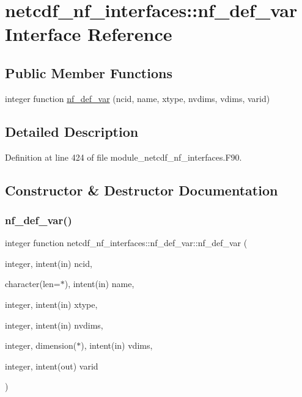 \hypertarget{interfacenetcdf__nf__interfaces_1_1nf__def__var}{}\section{netcdf\+\_\+nf\+\_\+interfaces\+:\+:nf\+\_\+def\+\_\+var Interface Reference}
\label{interfacenetcdf__nf__interfaces_1_1nf__def__var}
\subsection*{Public Member Functions}
\begin{DoxyCompactItemize}
\item 
integer function \hyperlink{interfacenetcdf__nf__interfaces_1_1nf__def__var_a7ec80a589d854e0f1045e1b178961dfd}{nf\+\_\+def\+\_\+var} (ncid, name, xtype, nvdims, vdims, varid)
\end{DoxyCompactItemize}


\subsection{Detailed Description}


Definition at line 424 of file module\+\_\+netcdf\+\_\+nf\+\_\+interfaces.\+F90.



\subsection{Constructor \& Destructor Documentation}
\mbox{\label{interfacenetcdf__nf__interfaces_1_1nf__def__var_a7ec80a589d854e0f1045e1b178961dfd}} 
\subsubsection{\texorpdfstring{nf\+\_\+def\+\_\+var()}{nf\_def\_var()}}
{\footnotesize\ttfamily integer function netcdf\+\_\+nf\+\_\+interfaces\+::nf\+\_\+def\+\_\+var\+::nf\+\_\+def\+\_\+var (\begin{DoxyParamCaption}\item[{integer, intent(in)}]{ncid,  }\item[{character(len=$\ast$), intent(in)}]{name,  }\item[{integer, intent(in)}]{xtype,  }\item[{integer, intent(in)}]{nvdims,  }\item[{integer, dimension($\ast$), intent(in)}]{vdims,  }\item[{integer, intent(out)}]{varid }\end{DoxyParamCaption})}



